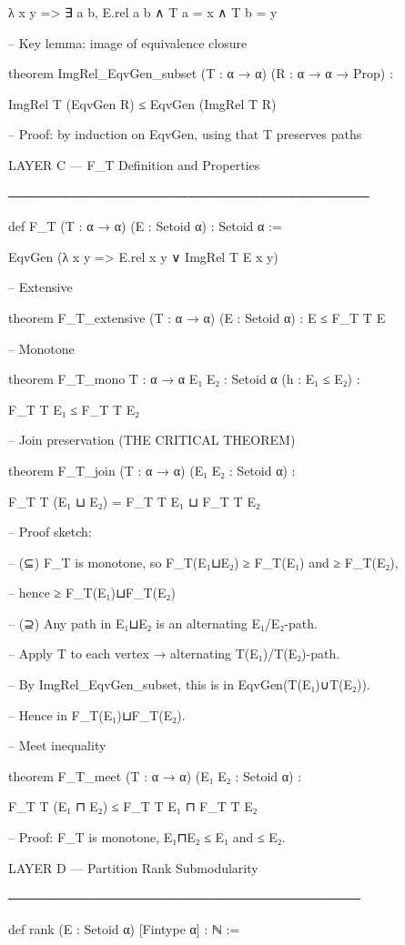 λ x y => ∃ a b, E.rel a b ∧ T a = x ∧ T b = y


-- Key lemma: image of equivalence closure

theorem ImgRel_EqvGen_subset (T : α → α) (R : α → α → Prop) :

ImgRel T (EqvGen R) ≤ EqvGen (ImgRel T R)


-- Proof: by induction on EqvGen, using that T preserves paths


LAYER C — F_T Definition and Properties

────────────────────────────────────────

def F_T (T : α → α) (E : Setoid α) : Setoid α :=

EqvGen (λ x y => E.rel x y ∨ ImgRel T E x y)


-- Extensive

theorem F_T_extensive (T : α → α) (E : Setoid α) : E ≤ F_T T E


-- Monotone

theorem F_T_mono {T : α → α} {E₁ E₂ : Setoid α} (h : E₁ ≤ E₂) :

F_T T E₁ ≤ F_T T E₂


-- Join preservation (THE CRITICAL THEOREM)

theorem F_T_join (T : α → α) (E₁ E₂ : Setoid α) :

F_T T (E₁ ⊔ E₂) = F_T T E₁ ⊔ F_T T E₂


-- Proof sketch:

-- (⊆) F_T is monotone, so F_T(E₁⊔E₂) ≥ F_T(E₁) and ≥ F_T(E₂),

--     hence ≥ F_T(E₁)⊔F_T(E₂)

-- (⊇) Any path in E₁⊔E₂ is an alternating E₁/E₂-path.

--     Apply T to each vertex → alternating T(E₁)/T(E₂)-path.

--     By ImgRel_EqvGen_subset, this is in EqvGen(T(E₁)∪T(E₂)).

--     Hence in F_T(E₁)⊔F_T(E₂).


-- Meet inequality

theorem F_T_meet (T : α → α) (E₁ E₂ : Setoid α) :

F_T T (E₁ ⊓ E₂) ≤ F_T T E₁ ⊓ F_T T E₂


-- Proof: F_T is monotone, E₁⊓E₂ ≤ E₁ and ≤ E₂.


LAYER D — Partition Rank Submodularity

───────────────────────────────────────

def rank (E : Setoid α) [Fintype α] : ℕ :=

